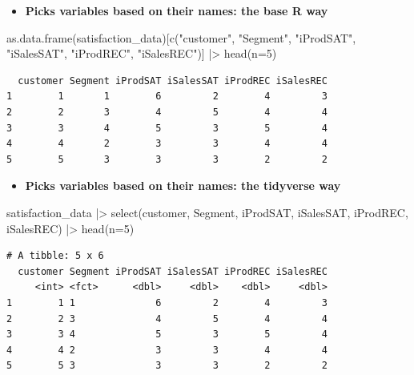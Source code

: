 \documentclass[
  ignorenonframetext,
]{beamer}
\newenvironment{Shaded}{\begin{snugshade}}{\end{snugshade}}
\newcommand{\AttributeTok}[1]{\textcolor[rgb]{0.40,0.45,0.13}{#1}}
\newcommand{\DecValTok}[1]{\textcolor[rgb]{0.68,0.00,0.00}{#1}}
\newcommand{\FunctionTok}[1]{\textcolor[rgb]{0.28,0.35,0.67}{#1}}
\newcommand{\NormalTok}[1]{\textcolor[rgb]{0.00,0.23,0.31}{#1}}
\newcommand{\SpecialCharTok}[1]{\textcolor[rgb]{0.37,0.37,0.37}{#1}}
\newcommand{\StringTok}[1]{\textcolor[rgb]{0.13,0.47,0.30}{#1}}
\providecommand{\tightlist}{%
  \setlength{\itemsep}{0pt}\setlength{\parskip}{0pt}}\usepackage{longtable,booktabs,array}
\begin{document}
\begin{frame}[fragile]{}
\label{section-13}
\begin{itemize}
\tightlist
\item
  \textbf{Picks variables based on their names: the base R way}
\end{itemize}

\tiny

\begin{Shaded}
\begin{Highlighting}[]
\FunctionTok{as.data.frame}\NormalTok{(satisfaction\_data)[}\FunctionTok{c}\NormalTok{(}\StringTok{"customer"}\NormalTok{, }\StringTok{"Segment"}\NormalTok{,}
                                   \StringTok{"iProdSAT"}\NormalTok{, }\StringTok{"iSalesSAT"}\NormalTok{, }\StringTok{"iProdREC"}\NormalTok{, }\StringTok{"iSalesREC"}\NormalTok{)] }\SpecialCharTok{|\textgreater{}}
  \FunctionTok{head}\NormalTok{(}\AttributeTok{n=}\DecValTok{5}\NormalTok{)}
\end{Highlighting}
\end{Shaded}

\begin{verbatim}
  customer Segment iProdSAT iSalesSAT iProdREC iSalesREC
1        1       1        6         2        4         3
2        2       3        4         5        4         4
3        3       4        5         3        5         4
4        4       2        3         3        4         4
5        5       3        3         3        2         2
\end{verbatim}

\normalsize

\begin{itemize}
\tightlist
\item
  \textbf{Picks variables based on their names: the tidyverse way}
\end{itemize}

\tiny

\begin{Shaded}
\begin{Highlighting}[]
\NormalTok{satisfaction\_data }\SpecialCharTok{|\textgreater{}}
  \FunctionTok{select}\NormalTok{(customer, Segment, iProdSAT, iSalesSAT, iProdREC, iSalesREC) }\SpecialCharTok{|\textgreater{}}
  \FunctionTok{head}\NormalTok{(}\AttributeTok{n=}\DecValTok{5}\NormalTok{)}
\end{Highlighting}
\end{Shaded}

\begin{verbatim}
# A tibble: 5 x 6
  customer Segment iProdSAT iSalesSAT iProdREC iSalesREC
     <int> <fct>      <dbl>     <dbl>    <dbl>     <dbl>
1        1 1              6         2        4         3
2        2 3              4         5        4         4
3        3 4              5         3        5         4
4        4 2              3         3        4         4
5        5 3              3         3        2         2
\end{verbatim}
\end{frame}
\end{document}
